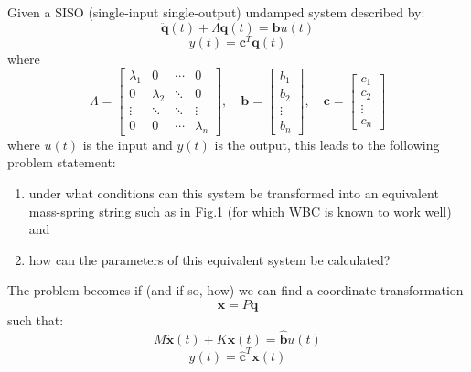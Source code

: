 \documentclass{mbd_fullpaper}
\begin{document}
Given a SISO (single-input single-output) undamped system described by:
\begin{equation}
\ddot{\mathbf{q}}(t) + \Lambda\mathbf{q}(t) = \mathbf{b}u(t)
\label{eq:modal1}
\end{equation}
\begin{equation}
y(t) = \mathbf{c}^T \mathbf{q}(t)
\label{eq:modal2}
\end{equation}
where
\begin{equation}
\Lambda = \begin{bmatrix}
\lambda_1  &  0 & \cdots & 0 \\
0 & \lambda_2  & \ddots & 0 \\
\vdots & \ddots & \ddots & \vdots \\
0 & 0 & \cdots & \lambda_n \end{bmatrix}
,\quad \mathbf{b} = \begin{bmatrix} b_1 \\ b_2 \\ \vdots \\ b_n \end{bmatrix}
,\quad \mathbf{c} = \begin{bmatrix} c_1 \\ c_2 \\ \vdots \\ c_n \end{bmatrix}
\label{eq:modal3}
\end{equation}
where $u(t)$ is the input and $y(t)$ is the output, this leads to the following problem statement:
\begin{enumerate}
\item under what conditions can this system be transformed into an equivalent mass-spring string such as in Fig.1 (for which WBC is known to work well) and
\item how can the parameters of this equivalent system be calculated?
\end{enumerate}
The problem becomes if (and if so, how) we can find a coordinate transformation
\begin{equation}
\mathbf{x} = P \mathbf{q}
\label{eq:transform}
\end{equation}
such that:
\begin{equation}
M\ddot{\mathbf{x}}(t) + K\mathbf{x}(t) = \mathbf{\hat{b}}u(t)
\label{eq:ms1}
\end{equation}
\begin{equation}
y(t) = \mathbf{\hat{c}}^T \mathbf{x}(t)
\label{eq:ms2}
\end{equation}
\end{document}
